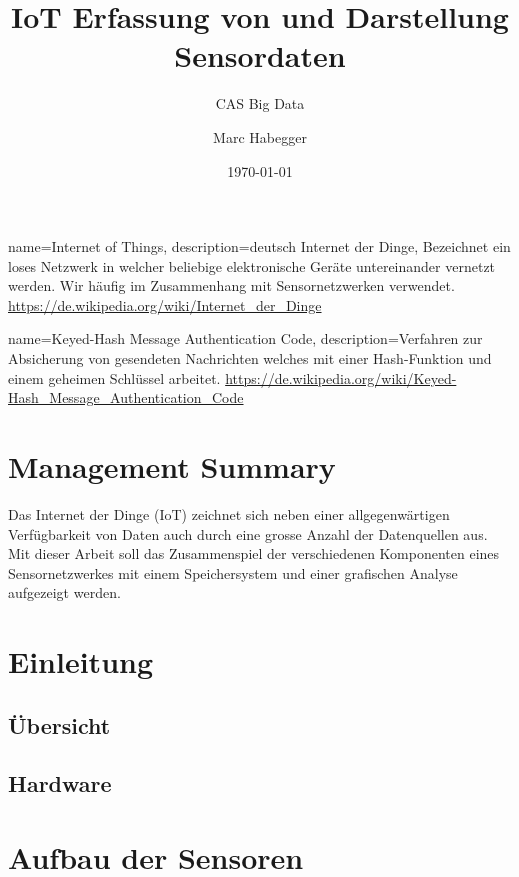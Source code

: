 \documentclass[
  10pt, %
  a4paper, %
  twoside, %
  openright, %
  numbers=noenddot, %
  BCOR=5mm, %
  parskip=half*, %
  thesis, %
]{bfhbook}
\author{Marc Habegger}
\title{IoT Erfassung von und Darstellung Sensordaten}
\subtitle{CAS Big Data}
\date{\today} %
\begin{document}
 
{
    name=Internet of Things,
    description={deutsch Internet der Dinge, Bezeichnet ein loses Netzwerk in welcher beliebige elektronische Geräte untereinander vernetzt werden. Wir häufig im Zusammenhang mit Sensornetzwerken verwendet.\break 
    \url{https://de.wikipedia.org/wiki/Internet_der_Dinge}}
}

{
    name=Keyed-Hash Message Authentication Code,
    description={Verfahren zur Absicherung von gesendeten Nachrichten welches mit einer Hash-Funktion und einem geheimen Schlüssel arbeitet.\break
    \url{https://de.wikipedia.org/wiki/Keyed-Hash_Message_Authentication_Code}}
}

\maketitle
\frontmatter %

\tableofcontents
\sloppy
\mainmatter %
\chapter*{Management Summary}

Das Internet der Dinge (\Gls{IoT}) zeichnet sich neben einer allgegenwärtigen Verfügbarkeit von Daten auch durch eine grosse Anzahl der Datenquellen aus. Mit dieser Arbeit soll das Zusammenspiel der verschiedenen Komponenten eines Sensornetzwerkes mit einem Speichersystem und einer grafischen Analyse aufgezeigt werden.

\chapter{Einleitung}
\section{Übersicht}
\section{Hardware}
\chapter{Aufbau der Sensoren}
\end{document}
